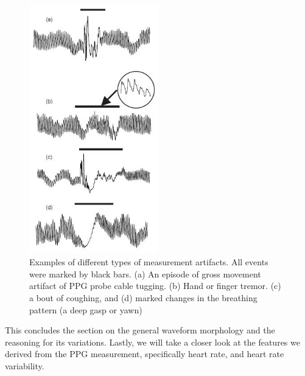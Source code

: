 \begin{figure}[ht]
	\centering
  \includegraphics[width=0.5\textwidth, angle=0]{images/ppg_a.jpg}
	\caption[Types of measurement artifacts]{Examples of different types of measurement artifacts. All events were marked by black bars. (a) An episode of gross movement artifact of PPG probe cable tugging. (b) Hand or finger tremor. (c) a bout of coughing, and (d) marked changes in the breathing pattern (a deep gasp or yawn) }
	\label{ppg_a}
\end{figure}

This concludes the section on the general waveform morphology and the reasoning for its variations. Lastly, we will take a closer look at the features we derived from the PPG measurement, specifically heart rate, and heart rate variability.

